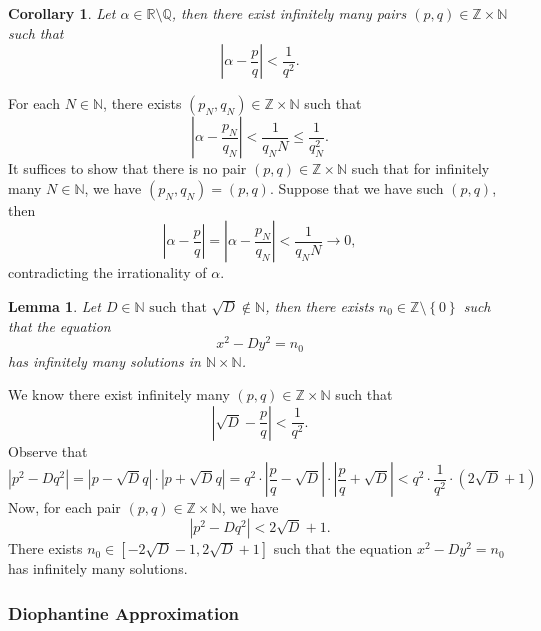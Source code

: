 \documentclass[11pt]{article}
\newtheorem{cor}{Corollary}[thm]
\newtheorem{lemma}[thm]{Lemma}
\theoremstyle{definition}
\newcommand{\sm}[0]{\setminus}
\newcommand{\set}[1]{\left\{ #1 \right\}}
\newcommand{\st}[0]{\text{ such that }}
\newcommand{\abs}[1]{\left\lvert#1\right\rvert} %
\newcommand{\RR}{\mathbb{R}}
\newcommand{\QQ}{\mathbb{Q}}
\newcommand{\ZZ}{\mathbb{Z}}
\newcommand{\NN}{\mathbb{N}}
\begin{document}
\begin{cor}
	Let $\alpha\in\RR\sm\QQ$, then there exist infinitely many pairs $(p,q)\in\ZZ\times\NN$ such that 
	$$ \abs{\alpha-\frac{p}{q}} < \frac{1}{q^2} . $$
\end{cor}
\proof
	For each $N\in\NN$, there exists $(p_N,q_N) \in \ZZ\times\NN$ such that 
	$$ \abs{\alpha-\frac{p_N}{q_N}} < \frac1{q_N N} \le \frac1{q_N^2} . $$
	It suffices to show that there is no pair $(p,q) \in \ZZ\times\NN$ such that for infinitely many $N\in\NN$, 
	we have $(p_N,q_N) = (p,q)$. 
	Suppose that we have such $(p,q)$, then
	$$ \abs{\alpha - \frac{p}{q}} = \abs{\alpha - \frac{p_N}{q_N}} < \frac1{q_N N} \to 0 , $$
	contradicting the irrationality of $\alpha$. 
\qedhere

\begin{lemma}
	Let $D\in\NN \st \sqrt{D}\not\in\NN$, then there exists $n_0\in\ZZ\sm\set{0}$ such that the equation
	$$ x^2-Dy^2 = n_0 $$
	has infinitely many solutions in $\NN\times\NN$. 
\end{lemma}
\proof
	We know there exist infinitely many $(p,q) \in \ZZ\times\NN$ such that 
	$$ \abs{\sqrt{D} - \frac{p}{q}} < \frac1{q^2} . $$
	Observe that 
	\[
		\abs{ p^2 - Dq^2 } = \abs{ p - \sqrt{D}q } \cdot \abs{ p + \sqrt{D} q }
		= q^2 \cdot \abs{ \frac{p}{q} - \sqrt{D} } \cdot \abs{ \frac{p}{q} + \sqrt{D} }
		< q^2 \cdot \frac1{q^2} \cdot (2\sqrt{D} + 1)
	\]
	Now, for each pair $(p,q)\in\ZZ\times\NN$, we have 
	$$ \abs{ p^2 - D q^2 } < 2 \sqrt{D} + 1 . $$
	There exists $n_0 \in [-2\sqrt{D}-1, 2\sqrt{D}+1]$ such that the equation $x^2 - Dy^2 = n_0$ has infinitely many solutions.
\qedhere


\subsubsection{Diophantine Approximation}


\end{document}
